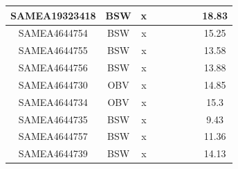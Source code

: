 \documentclass[../main.tex]{subfiles}
\begin{document}
\begin{flushleft}
\begin{footnotesize}
\begin{longtable}{|c|c|c|c|c|c|c|}
    \hline
    SAMEA19323418 & BSW   & x                                                            & ~          & ~                                                                           & ~                                                                 & 18.83     \\ 
    \hline
    SAMEA4644754  & BSW   & x                                                            & ~          & ~                                                                           & ~                                                                 & 15.25     \\ 
    \hline
    SAMEA4644755  & BSW   & x                                                            & ~          & ~                                                                           & ~                                                                 & 13.58     \\ 
    \hline
    SAMEA4644756  & BSW   & x                                                            & ~          & ~                                                                           & ~                                                                 & 13.88     \\ 
    \hline
    SAMEA4644730  & OBV   & x                                                            & ~          & ~                                                                           & ~                                                                 & 14.85     \\ 
    \hline
    SAMEA4644734  & OBV   & x                                                            & ~          & ~                                                                           & ~                                                                 & 15.3      \\ 
    \hline
    SAMEA4644735  & BSW   & x                                                            & ~          & ~                                                                           & ~                                                                 & 9.43      \\ 
    \hline
    SAMEA4644757  & BSW   & x                                                            & ~          & ~                                                                           & ~                                                                 & 11.36     \\ 
    \hline
    SAMEA4644739  & BSW   & x                                                            & ~          & ~                                                                           & ~                                                                 & 14.13     \\ 

\end{longtable}
\end{footnotesize}
\end{flushleft}
\end{document}
